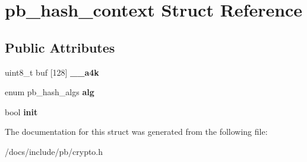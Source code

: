 \hypertarget{structpb__hash__context}{}\section{pb\+\_\+hash\+\_\+context Struct Reference}
\label{structpb__hash__context}
\subsection*{Public Attributes}
\begin{DoxyCompactItemize}
\item 
\mbox{\label{structpb__hash__context_a2589da3736d2c155dfdf9dda41ed4295}} 
uint8\+\_\+t buf \mbox{[}128\mbox{]} {\bfseries \+\_\+\+\_\+a4k}
\item 
\mbox{\label{structpb__hash__context_ac8bf85d71f707cc60b2b4c5d8be42026}} 
enum pb\+\_\+hash\+\_\+algs {\bfseries alg}
\item 
\mbox{\label{structpb__hash__context_a2dda6ac980fcc3245655df056404df20}} 
bool {\bfseries init}
\end{DoxyCompactItemize}


The documentation for this struct was generated from the following file\+:\begin{DoxyCompactItemize}
\item 
/docs/include/pb/crypto.\+h\end{DoxyCompactItemize}
